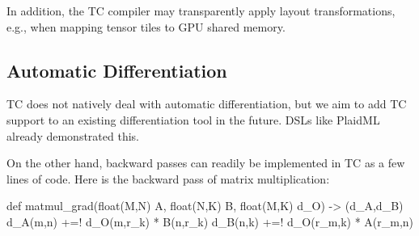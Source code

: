 In addition, the TC compiler may transparently apply layout
transformations, e.g., when mapping tensor tiles to GPU shared memory.

\subsection{Automatic Differentiation}
TC does not natively deal with automatic differentiation, but we aim
to add TC support to an existing differentiation tool in the
future. DSLs like PlaidML \cite{PlaidML} already
demonstrated this.

On the other hand, backward passes can readily be implemented in TC as
a few lines of code. Here is the backward pass of matrix
multiplication:
\begin{tclisting}
def matmul_grad(float(M,N) A, float(N,K) B, float(M,K) d_O) -> (d_A,d_B) {
  d_A(m,n) +=! d_O(m,r_k) * B(n,r_k)
  d_B(n,k) +=! d_O(r_m,k) * A(r_m,n)
}
\end{tclisting}
